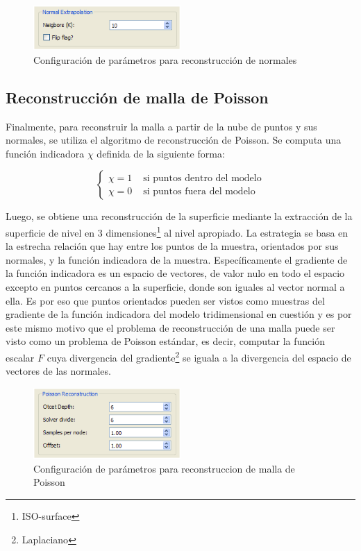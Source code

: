 \begin{figure}[H]
  \centering
    \includegraphics[width=0.5\textwidth]{./Cap6_reconstruccion/malla-normalextrapolation.png}
  \caption{Configuración de parámetros para reconstrucción de normales}
  \label{fig:Mesh-Extrapolation}
\end{figure}

\subsection{Reconstrucción de malla de Poisson}

Finalmente, para reconstruir la malla a partir de la nube de puntos y sus normales, se utiliza el algoritmo de reconstrucción de Poisson.
Se computa una función indicadora $\chi$ definida de la siguiente forma:

$$
\left\{ \begin{array}{rl}
 \chi = 1 & \mbox{ si puntos dentro del modelo} \\
 \chi = 0 & \mbox{ si puntos fuera del modelo}
       \end{array} \right.
$$

Luego, se obtiene una reconstrucción de la superficie mediante la extracción de la superficie de nivel en 3 dimensiones\footnote{ISO-surface} al nivel apropiado.
La estrategia se basa en la estrecha relación que hay entre los puntos de la muestra, orientados por sus normales, y la función indicadora de la muestra. Específicamente el gradiente de la función indicadora es un espacio de vectores, de valor nulo en todo el espacio excepto en puntos cercanos a la superficie, donde son iguales al vector normal a ella.
Es por eso que puntos orientados pueden ser vistos como muestras del gradiente de la función indicadora del modelo tridimensional en cuestión y es por este mismo motivo que el problema de reconstrucción de una malla puede ser visto como un problema de Poisson estándar, es decir, computar la función escalar $F$ cuya divergencia del gradiente\footnote{Laplaciano} se iguala a la divergencia del espacio de vectores de las normales.

\begin{figure}[H]
  \centering
    \includegraphics[width=0.5\textwidth]{./Cap6_reconstruccion/malla-poissonreconstruction.png}
  \caption{Configuración de parámetros para reconstruccion de malla de Poisson}
  \label{fig:Mesh-Normals}
\end{figure}

